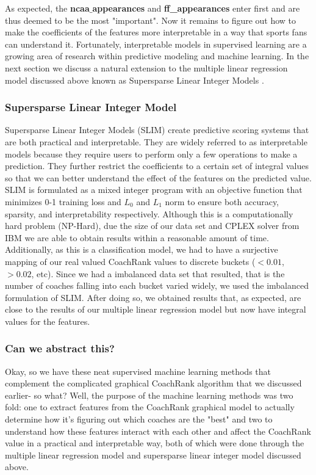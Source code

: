 \documentclass[11pt,notitlepage]{article}
\begin{document}
\noindent As expected, the \textbf{ncaa$\_$appearances} and \textbf{ff\_appearances} enter first and are thus deemed to be the most "important". Now it remains to figure out how to make the coefficients of the features more interpretable in a way that sports fans can understand it. Fortunately, interpretable models in supervised learning are a growing area of research within predictive modeling and machine learning. In the next section we discuss a natural extension to the multiple linear regression model discussed above known as Supersparse Linear Integer Models \cite{SLIM}.

\subsubsection*{Supersparse Linear Integer Model}

Supersparse Linear Integer Models (SLIM) create predictive scoring systems that are both practical and interpretable. They are widely referred to as interpretable models because they require users to perform only a few operations to make a prediction. They further restrict the coefficients to a certain set of integral values so that we can better understand the effect of the features on the predicted value. SLIM is formulated as a mixed integer program with an objective function that minimizes 0-1 training loss and $L_0$ and $L_1$ norm to ensure both accuracy, sparsity, and interpretability respectively. Although this is a computationally hard problem (NP-Hard), due the size of our data set and CPLEX solver from IBM we are able to obtain results within a reasonable amount of time. Additionally, as this is a classification model, we had to have a surjective mapping of our real valued CoachRank values to discrete buckets ($<0.01$, $>0.02$, etc). Since we had a imbalanced data set that resulted, that is the number of coaches falling into each bucket varied widely, we used the imbalanced formulation of SLIM. After doing so, we obtained results that, as expected, are close to the results of our multiple linear regression model but now have integral values for the features.        

\subsubsection*{Can we abstract this?}

\noindent Okay, so we have these neat supervised machine learning methods that complement the complicated graphical CoachRank algorithm that we discussed earlier- so what? Well, the purpose of the machine learning methods was two fold: one to extract features from the CoachRank graphical model to actually determine how it's figuring out which coaches are the "best" and two to understand how these features interact with each other and affect the CoachRank value in a practical and interpretable way, both of which were done through the multiple linear regression model and supersparse linear integer model discussed above.  
\end{document}
